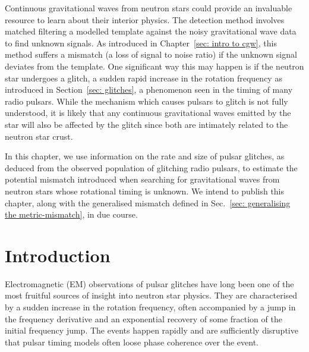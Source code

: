 \documentclass[../full_thesis/full_thesis.tex]{subfiles}
\begin{document}
Continuous gravitational waves from neutron stars could provide an invaluable
resource to learn about their interior physics. The detection method involves
matched filtering a modelled template against the noisy gravitational wave data
to find unknown signals. As introduced in Chapter~\ref{sec: intro to cgw}, this
method suffers a mismatch (a loss of signal to noise ratio) if the unknown
signal deviates from the template. One significant way this may happen is if
the neutron star undergoes a glitch, a sudden rapid increase in the rotation
frequency as introduced in Section~\ref{sec: glitches}, a phenomenon seen in the
timing of many radio pulsars.  While the mechanism which causes pulsars to
glitch is not fully understood, it is likely that any continuous
gravitational waves emitted by the star will also be affected by the glitch since
both are intimately related to the neutron star crust.

In this chapter, we use information on the rate and size of pulsar glitches, as
deduced from the observed population of glitching radio pulsars, to estimate
the potential mismatch introduced when searching for gravitational waves from
neutron stars whose rotational timing is unknown. We intend to publish this
chapter, along with the generalised mismatch defined in Sec.~\ref{sec:
generalising the metric-mismatch}, in due course.



\section{Introduction}
\label{sec: glitches introduction}

Electromagnetic (EM) observations of pulsar glitches have long been one of the most
fruitful sources of insight into neutron star physics. They are characterised
by a sudden increase in the rotation frequency, often accompanied by a jump in
the frequency derivative and an exponential recovery of some fraction of the
initial frequency jump. The events happen
rapidly and are sufficiently disruptive that pulsar timing models often loose phase
coherence over the event.
\end{document}
